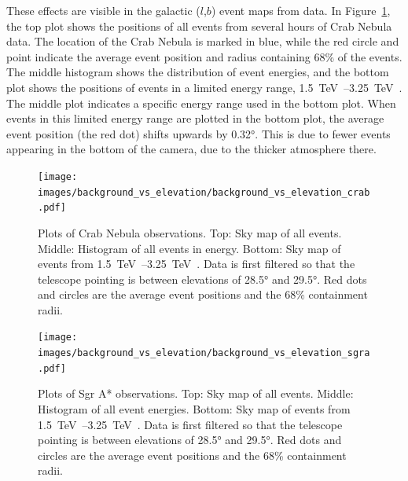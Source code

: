 These effects are visible in the galactic ($l$,$b$) event maps from data.
In Figure~\ref{fig:bkgvsel_crab}, the top plot shows the positions of all events from several hours of Crab Nebula data.
The location of the Crab Nebula is marked in blue, while the red circle and point indicate the average event position and radius containing 68\% of the events.
The middle histogram shows the distribution of event energies, and the bottom plot shows the positions of events in a limited energy range, \SIrange{1.5}{3.25}{\TeV{}}.
The middle plot indicates a specific energy range used in the bottom plot.
When events in this limited energy range are plotted in the bottom plot, the average event position (the red dot) shifts upwards by \ang{0.32}.
This is due to fewer events appearing in the bottom of the camera, due to the thicker atmosphere there.
    
% 
%
\begin{figure}[p]
  \centering
  \texttt{[image: images/background\_vs\_elevation/background\_vs\_elevation\_crab.pdf]}
  \caption[Background Vs Elevation Crab Nebula]
  {\small 
    Plots of Crab Nebula observations.
    Top: Sky map of all events.
    Middle: Histogram of all events in energy.
    Bottom: Sky map of events from \SIrange{1.5}{3.25}{\TeV{}}.  
    Data is first filtered so that the telescope pointing is between elevations of \ang{28.5} and \ang{29.5}.
    Red dots and circles are the average event positions and the 68\% containment radii.
  }
  \label{fig:bkgvsel_crab}
\end{figure}
    
\begin{figure}[p]
  \centering
  \texttt{[image: images/background\_vs\_elevation/background\_vs\_elevation\_sgra.pdf]}
  \caption[Background Vs Elevation Sgr A*]
  {\small 
    Plots of Sgr A* observations.
    Top: Sky map of all events.
    Middle: Histogram of all event energies.
    Bottom: Sky map of events from \SIrange{1.5}{3.25}{\TeV{}}.  
    Data is first filtered so that the telescope pointing is between elevations of \ang{28.5} and \ang{29.5}.
    Red dots and circles are the average event positions and the 68\% containment radii.
  }
  \label{fig:bkgvsel_sgra}
\end{figure}

